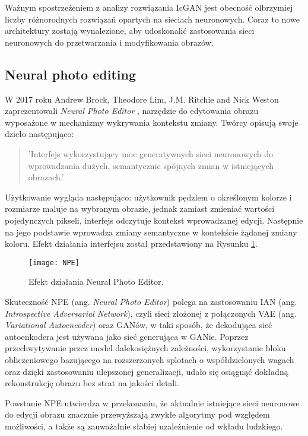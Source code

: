     Ważnym spostrzeżeniem z analizy rozwiązania IcGAN jest obecność
    olbrzymiej liczby różnorodnych rozwiązań opartych na sieciach neuronowych.
    Coraz to nowe architektury zostają wynalezione, aby udoskonalić
    zastosowania sieci neuronowych do przetwarzania i modyfikowania obrazów.

  \subsection{Neural photo editing}
    W 2017 roku Andrew Brock, Theodore Lim, J.M. Ritchie and Nick Weston
    zaprezentowali \textit{Neural Photo Editor} \cite{neural_photo_editor}, narzędzie
    do edytowania obrazu wyposażone w mechanizmy wykrywania kontekstu zmiany.
    Twórcy opisują swoje dzieło następująco:

    \begin{quote}
      'Interfejs wykorzystujący moc generatywnych sieci neuronowych do
      wprowadzania dużych, semantycznie spójnych zmian w istniejących obrazach.'
    \end{quote}

    Użytkowanie wygląda następująco: użytkownik pędzlem o określonym kolorze i
    rozmiarze maluje na wybranym obrazie, jednak zamiast zmieniać wartości
    pojedynczych pikseli, interfejs odczytuje kontekst wprowadzanej edycji.
    Następnie na jego podstawie wprowadza zmiany
    semantyczne w kontekście żądanej zmiany koloru. Efekt działania interfejsu
    został przedstawiony na Rysunku \ref{fig:npe}.

    \begin{figure}[ht]
      \centering
      \texttt{[image: NPE]}
      \caption[Efekt działania \textit{Neural Photo Editor} - źródło: \cite{neural_photo_editor}]
      {Efekt działania Neural Photo Editor.}
      \label{fig:npe}
    \end{figure}

    Skuteczność NPE (ang. \textit{Neural Photo Editor}) polega na zastosowaniu IAN
    (ang. \textit{Introspective Adversarial Network}), czyli sieci złożonej z połączonych
    VAE (ang. \textit{Variational Autoencoder}) \cite{vae} oraz GANów, w taki sposób, że dekodująca
    sieć autoenkodera jest używana jako sieć generująca w GANie.
    Poprzez przechwytywanie przez model dalekosiężnych zależności, wykorzystanie
    bloku obliczeniowego bazującego na rozszerzonych splotach o
    współdzielonych wagach oraz dzięki zastosowaniu ulepszonej generalizacji,
    udało się osiągnąć dokładną rekonstrukcję obrazu bez strat na jakości detali.

    Powstanie NPE utwierdza w przekonaniu, że aktualnie istniejące sieci
    neuronowe do edycji obrazu znacznie przewyższają zwykłe algorytmy pod
    względem możliwości, a także są zauważalnie słabiej uzależnienie od wkładu
    ludzkiego.
